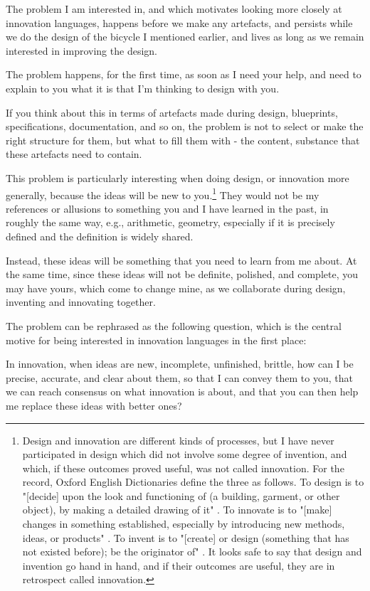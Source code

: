 The problem I am interested in, and which motivates looking more closely at innovation languages, happens before we make any artefacts, and persists while we do the design of the bicycle I mentioned earlier, and lives as long as we remain interested in improving the design. 

The problem happens, for the first time, as soon as I need your help, and need to explain to you what it is that I'm thinking to design with you. 

If you think about this in terms of artefacts made during design, blueprints, specifications, documentation, and so on, the problem is not to select or make the right structure for them, but what to fill them with - the content, substance that these artefacts need to contain. 

This problem is particularly interesting when doing design, or innovation more generally, because the ideas will be new to you.\footnote{Design and innovation are different kinds of processes, but I have never participated in design which did not involve some degree of invention, and which, if these outcomes proved useful, was not called innovation. For the record, Oxford English Dictionaries define the three as follows. To design is to "[decide] upon the look and functioning of (a building, garment, or other object), by making a detailed drawing of it" \cite{def-design}. To innovate is to "[make] changes in something established, especially by introducing new methods, ideas, or products" \cite{def-innovate}. To invent is to "[create] or design (something that has not existed before); be the originator of" \cite{def-invent}. It looks safe to say that design and invention go hand in hand, and if their outcomes are useful, they are in retrospect called innovation.} They would not be my references or allusions to something you and I have learned in the past, in roughly the same way, e.g., arithmetic, geometry, especially if it is precisely defined and the definition is widely shared. 

Instead, these ideas will be something that you need to learn from me about. At the same time, since these ideas will not be definite, polished, and complete, you may have yours, which come to change mine, as we collaborate during design, inventing and innovating together.

The problem can be rephrased as the following question, which is the central motive for being interested in innovation languages in the first place:

In innovation, when ideas are new, incomplete, unfinished, brittle, how can I be precise, accurate, and clear about them, so that I can convey them to you, that we can reach consensus on what innovation is about, and that you can then help me replace these ideas with better ones? 

